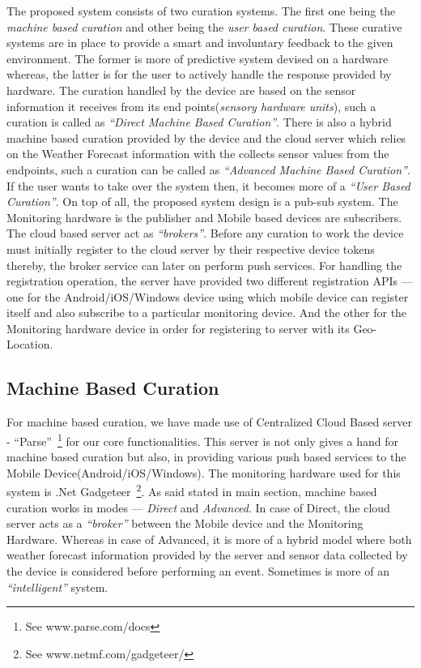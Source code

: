 \documentclass[10pt]{article}
\begin{document}
The proposed system consists of two curation systems. The first one being the \emph{machine based curation} and other being the \emph{user based curation}. These curative systems are in place to provide a smart and involuntary feedback to the given environment. The former is more of predictive system devised on a hardware whereas, the latter is for the user to actively handle the response provided by hardware. The curation handled by the device are based on the sensor information it receives from its end points(\emph{sensory hardware units}), such a curation is called as \emph{``Direct Machine Based Curation''}. There is also a hybrid machine based curation provided by the device and the cloud server which relies on the Weather Forecast information with the collects sensor values from the endpoints, such a curation can be called as \emph{``Advanced Machine Based Curation''}. If the user wants to take over the system then, it becomes more of a \emph{``User Based Curation''}. On top of all, the proposed system design is a pub-sub system. The Monitoring hardware is the publisher and Mobile based devices are subscribers. The cloud based server act as \emph{``brokers''}. Before any curation to work the device must initially register to the cloud server by their respective device tokens thereby, the broker service can later on perform push services. For handling the registration operation, the server have provided two different registration APIs --- one for the Android/iOS/Windows device using which mobile device can register itself and also subscribe to a particular monitoring device. And the other for the Monitoring hardware device in order for registering to server with its Geo-Location.

\subsection*{Machine Based Curation}

For machine based curation, we have made use of Centralized Cloud Based server - ``Parse''~\footnote{See www.parse.com/docs} for our core functionalities. This server is not only gives a hand for machine based curation but also, in providing various push based services to the Mobile Device(Android/iOS/Windows). The monitoring hardware used for this system is .Net Gadgeteer~\footnote{See www.netmf.com/gadgeteer/}. As said stated in main section, machine based curation works in modes --- \emph{Direct} and \emph{Advanced}. In case of Direct, the cloud server acts as a \emph{``broker''} between the Mobile device and the Monitoring Hardware. Whereas in case of Advanced, it is more of a hybrid model where both weather forecast information provided by the server and sensor data collected by the device is considered before performing an event. Sometimes is more of an \emph{``ìntelligent''} system.
\end{document}
